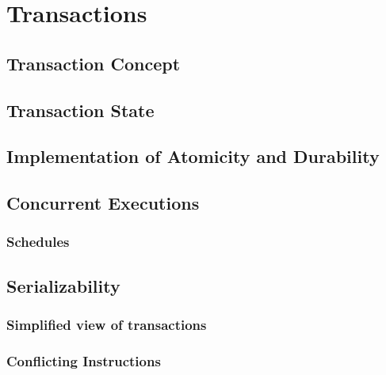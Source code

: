 \newpage
\section{Transactions}
\subsection{Transaction Concept}


\subsection{Transaction State}


\subsection{Implementation of Atomicity and Durability}


\subsection{Concurrent Executions}

\subsubsection{Schedules}



\subsection{Serializability}

\subsubsection{Simplified view of transactions}

\subsubsection{Conflicting Instructions}



